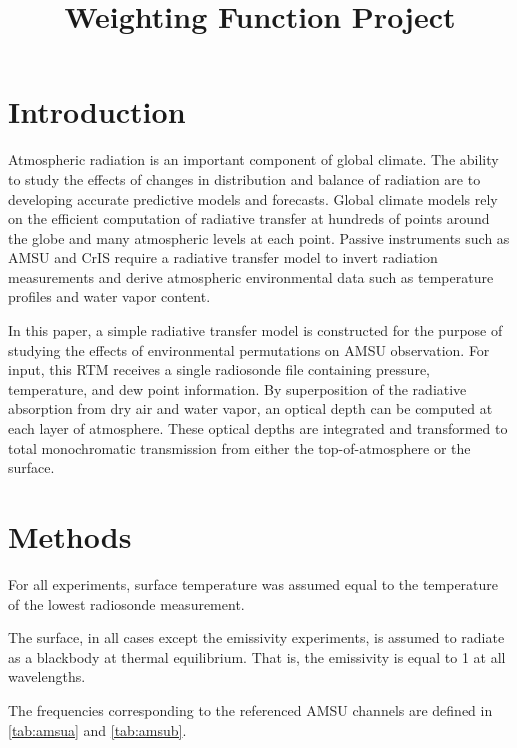 \documentclass[twocol]{ametsoc}
\title{Weighting Function Project}
\affiliation{University of Wisconsin - Madison}
\begin{document}
\maketitle


%
\section{Introduction}

Atmospheric radiation is an important component of global climate.
The ability to study the effects of changes in distribution and balance of radiation are to developing accurate predictive models and forecasts.
Global climate models rely on the efficient computation of radiative transfer at hundreds of points around the globe and many atmospheric levels at each point.
Passive instruments such as AMSU and CrIS require a radiative transfer model to invert radiation measurements and derive atmospheric environmental data such as temperature profiles and water vapor content.
\par In this paper, a simple radiative transfer model is constructed for the purpose of studying the effects of environmental permutations on AMSU observation.
For input, this RTM receives a  single radiosonde file containing pressure, temperature, and dew point information.
By superposition of the radiative absorption from dry air and water vapor, an optical depth can be computed at each layer of atmosphere.
These optical depths are integrated and transformed to total monochromatic transmission from either the top-of-atmosphere or the surface.

\section{Methods}

For all experiments, surface temperature was assumed equal to the temperature of the lowest radiosonde measurement.

The surface, in all cases except the emissivity experiments, is assumed to radiate as a blackbody at thermal equilibrium. That is, the emissivity is equal to 1 at all wavelengths.

The frequencies corresponding to the referenced AMSU channels are defined in \autoref{tab:amsua} and \autoref{tab:amsub}.
\end{document}

